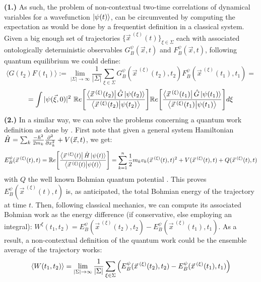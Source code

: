 \documentclass[11pt, a4paper]{article} %
\begin{document}
{\bf (1.)} As such, the problem of non-contextual two-time correlations of dynamical variables for a wavefunction $\ket{\psi(t)}$, can be circumvented by computing the expectation as would be done by a frequentist definition in a classical system. Given a big enough set of trajectories $\{\vec{x}^{\:(\xi)}(t)\}_{\xi\in \Sigma}$ each with associated ontologically deterministic observables $G_B^\psi(\vec{x},t)$ and $F_B^\psi(\vec{x},t)$, following quantum equilibrium \cite{Absolute} we could define:\vspace{-0.2cm}
\begin{equation}
\langle G(t_2)F(t_1)\rangle := \lim_{|\Sigma|\rightarrow \infty}\frac{1}{|\Sigma|} \sum_{\xi\in\Sigma} G_B^\psi(\vec{x}^{\:(\xi)}(t_2),t_2)F_B^\psi(\vec{x}^{\:(\xi)}(t_1),t_1) =
\end{equation}
$$
=  \int |\psi(\vec{\xi},0)|^2\ \mathbb{R}e\qty[ \frac{\bra{\vec{x}^{\:(\xi)}(t_2)}\hat{G}\ket{\psi(t_2)}}{\bra{\vec{x}^{\:(\xi)}(t_2)}\ket{\psi(t_2)}} ] \mathbb{R}e\qty[ \frac{\bra{\vec{x}^{\:(\xi)}(t_1)}\hat{G}\ket{\psi(t_1)}}{\bra{\vec{x}^{\:(\xi)}(t_1)}\ket{\psi(t_1)}} ]d\xi
$$
{\bf (2.) } In a similar way, we can solve the problems concerning a quantum work definition as done by \cite{work1, work2}. First note that given a general system Hamiltonian $\hat{H}=\sum_k \frac{-\hbar^2}{2m_k}\pdv[2]{}{x_k}+V(\vec{x},t)$, we get:
\begin{equation}
E^\psi_B(\vec{x}^{\:(\xi)}(t),t) = \mathbb{R}e\qty[ \frac{\bra{\vec{x}^{\:(\xi)}(t)}\hat{H}\ket{\psi(t)}}{\bra{\vec{x}^{\:(\xi)}(t)}\ket{\psi(t)}} ] = \sum_{k=1}^n\frac{1}{2}m_kv_k(\vec{x}^{\:(\xi)}(t),t)^2+V(\vec{x}^{\:(\xi)}(t),t)+Q(\vec{x}^{\:(\xi)}(t),t)
\end{equation}
with $Q$ the well known Bohmian quantum potential \cite{Holland, Durr, JordiXavier}. This proves $E^\psi_B(\vec{x}^{\:(\xi)}(t),t)$ is, as anticipated, the total Bohmian energy of the trajectory at time $t$. Then, following classical mechanics, we can compute its associated Bohmian work as the energy difference (if conservative, else employing an integral): $W^\xi(t_1,t_2)= E^\psi_B(\vec{x}^{\:(\xi)}(t_2),t_2)-E^\psi_B(\vec{x}^{\:(\xi)}(t_1),t_1)$. As a result, a non-contextual definition of the quantum work could be the ensemble average of the trajectory works:
\begin{equation}
\langle W(t_1,t_2)\rangle = \lim_{|\Sigma|\rightarrow \infty}\frac{1}{|\Sigma|} \sum_{\xi\in\Sigma} \qty(E^\psi_B(\vec{x}^{\:(\xi)}(t_2),t_2)-E^\psi_B(\vec{x}^{\:(\xi)}(t_1),t_1))
\end{equation}
\end{document}
